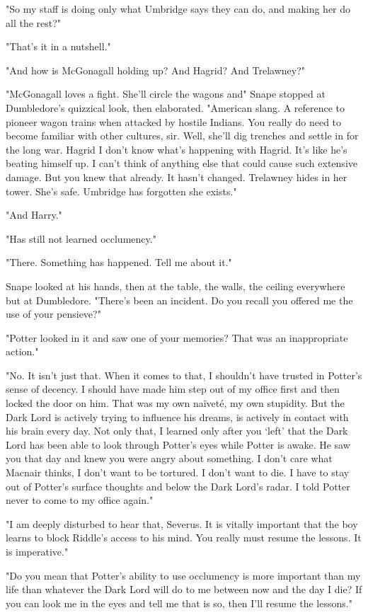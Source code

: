 "So my staff is doing only what Umbridge says they can do, and making her do all the rest?"

"That's it in a nutshell."

"And how is McGonagall holding up? And Hagrid? And Trelawney?"

"McGonagall loves a fight. She'll circle the wagons and{\el}" Snape stopped at Dumbledore's quizzical look, then elaborated. "American slang. A reference to pioneer wagon trains when attacked by hostile Indians. You really do need to become familiar with other cultures, sir. Well, she'll dig trenches and settle in for the long war. Hagrid{\el} I don't know what's happening with Hagrid. It's like he's beating himself up. I can't think of anything else that could cause such extensive damage. But you knew that already. It hasn't changed. Trelawney hides in her tower. She's safe. Umbridge has forgotten she exists."

"And Harry."

"Has still not learned occlumency."

"There. Something has happened. Tell me about it."

Snape looked at his hands, then at the table, the walls, the ceiling{\el} everywhere but at Dumbledore. "There's been an incident. Do you recall you offered me the use of your pensieve?"

"Potter looked in it and saw one of your memories? That was an inappropriate action."

"No. It isn't just that. When it comes to that, I shouldn't have trusted in Potter's sense of decency. I should have made him step out of my office first and then locked the door on him. That was my own naïveté, my own stupidity. But the Dark Lord is actively trying to influence his dreams, is actively in contact with his brain every day. Not only that, I learned only after you `left' that the Dark Lord has been able to look through Potter's eyes while Potter is awake. He saw you that day and knew you were angry about something. I don't care what Macnair thinks, I don't want to be tortured. I don't want to die. I have to stay out of Potter's surface thoughts and below the Dark Lord's radar. I told Potter never to come to my office again."

"I am deeply disturbed to hear that, Severus. It is vitally important that the boy learns to block Riddle's access to his mind. You really must resume the lessons. It is imperative."

"Do you mean that Potter's ability to use occlumency is more important than my life{\el} than whatever the Dark Lord will do to me between now and the day I die? If you can look me in the eyes and tell me that is so, then I'll resume the lessons."

